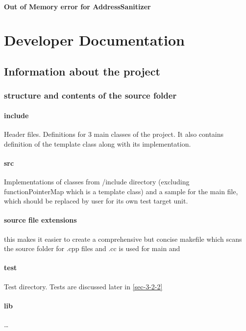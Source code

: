 \documentclass{elteikthesis}[2018/06/06]
\begin{document}
\subsubsection{Out of Memory error for AddressSanitizer}
\label{sec-2-6-2-1}
\chapter{Developer Documentation}
\label{sec-3}
\section{Information about the project}
\label{sec-3-1}
\subsection{structure and contents of the source folder}
\label{sec-3-1-1}
\subsubsection{include}
\label{sec-3-1-1-1}
Header files. Definitions for 3 main classes of the project. It also contains definition of the template class along with its implementation. \\
\subsubsection{src}
\label{sec-3-1-1-2}
Implementations of classes from /include directory (excluding functionPointerMap which is a template class) and a sample for the main file, which should be replaced by user for its own test target unit. \\
\subsubsection{source file extensions}
\label{sec-3-1-1-3}
this makes it easier to create a comprehensive but concise makefile which scans the source folder for .cpp files and .cc is used for main and \\
\subsubsection{test}
\label{sec-3-1-1-4}
Test directory. Tests are discussed later in \ref{sec-3-2-2} \\
\subsubsection{lib}
\label{sec-3-1-1-5}
\ldots{} \\
\end{document}
